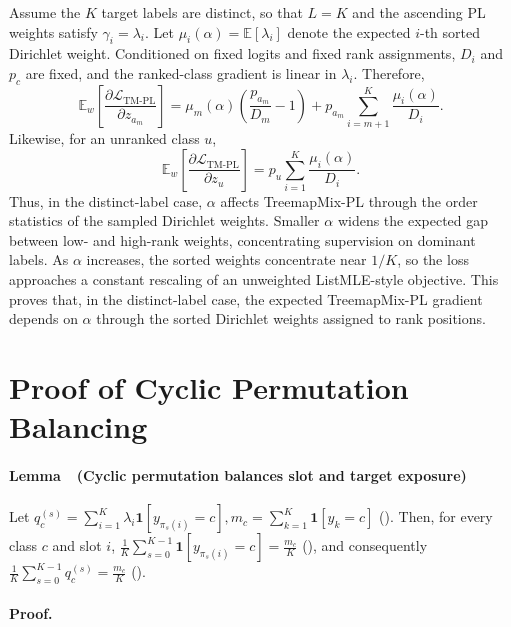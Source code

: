 Assume the $K$ target labels are distinct, so that $L=K$ and the ascending PL weights satisfy \(\gamma_i=\lambda_i\). Let \(\mu_i(\alpha)=\mathbb{E}[\lambda_i]\)
denote the expected $i$-th sorted Dirichlet weight. Conditioned on fixed logits and fixed rank assignments, $D_i$ and $p_c$ are fixed, and the ranked-class gradient is linear in $\lambda_i$. Therefore,
\[
\mathbb{E}_{w}
\left[
\frac{\partial \mathcal{L}_{\mathrm{TM\text{-}PL}}}{\partial z_{a_m}}
\right]
=
\mu_m(\alpha)
\left(
\frac{p_{a_m}}{D_m}-1
\right)
+
p_{a_m}
\sum_{i=m+1}^{K}
\frac{\mu_i(\alpha)}{D_i}.
\]
Likewise, for an unranked class $u$,
\[
\mathbb{E}_{w}
\left[
\frac{\partial \mathcal{L}_{\mathrm{TM\text{-}PL}}}{\partial z_u}
\right]
=
p_u
\sum_{i=1}^{K}
\frac{\mu_i(\alpha)}{D_i}.
\]
Thus, in the distinct-label case, $\alpha$ affects TreemapMix-PL through the order statistics of the sampled Dirichlet weights. Smaller $\alpha$ widens the expected gap between low- and high-rank weights, concentrating supervision on dominant labels. As $\alpha$ increases, the sorted weights concentrate near $1/K$, so the loss approaches a constant rescaling of an unweighted ListMLE-style objective. This proves that, in the distinct-label case, the expected TreemapMix-PL gradient depends on $\alpha$ through the sorted Dirichlet weights assigned to rank positions.

\section{Proof of Cyclic Permutation Balancing}\label{app:cyclic-balancing}

\label{lem:cyclic-balancing}
\paragraph{Lemma~\thelemma\ (Cyclic permutation balances slot and target exposure)}

Let \label{eq:cyclic-soft-target}\(q_c^{(s)}=\sum_{i=1}^{K}\lambda_i \mathbf{1}[y_{\pi_s(i)}=c], m_c=\sum_{k=1}^{K}\mathbf{1}[y_k=c]\)\textup{ (\theequation)}. Then, for every class $c$ and slot $i$, \label{eq:slot-balance}\(\frac{1}{K}\sum_{s=0}^{K-1}\mathbf{1}[y_{\pi_s(i)}=c]=\frac{m_c}{K}\)\textup{ (\theequation)}, and consequently \label{eq:cyclic-balance-soft}\(\frac{1}{K}\sum_{s=0}^{K-1}q_c^{(s)}=\frac{m_c}{K}\)\textup{ (\theequation)}.

\paragraph{Proof.}

